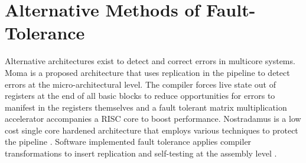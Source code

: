 \section{Alternative Methods of Fault-Tolerance}
Alternative architectures exist to detect and correct errors in multicore systems. Moma \cite{ferreira2014adaptive} is a proposed architecture that uses replication in the pipeline to detect errors at the micro-architectural level. The compiler forces live state out of registers at the end of all basic blocks to reduce opportunities for errors to manifest in the registers themselves and a fault tolerant matrix multiplication accelerator accompanies a RISC core to boost performance. Nostradamus is a low cost single core hardened architecture that employs various techniques to protect the pipeline \cite{nathan2014nostradamus}. Software implemented fault tolerance applies compiler transformations to insert replication and self-testing at the assembly level \cite{reis2005swift}.